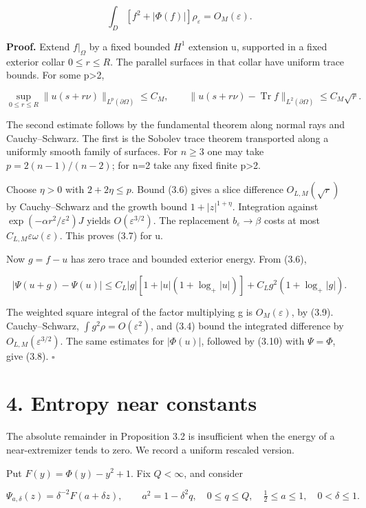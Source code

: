 \documentclass[11pt]{article}
\begin{document}
\[\int_D\left[f^2+|\Phi(f)|\right]\rho_\varepsilon=O_M(\varepsilon).\tag{3.8}\]

\textbf{Proof.} Extend \(f|_\Omega\) by a fixed bounded \(H^{1}\)
extension u, supported in a fixed exterior collar \(0\leq r\leq R\). The
parallel surfaces in that collar have uniform trace bounds. For some
p\textgreater2,

\[\sup_{0\leq r\leq R}\|u(s+r\nu)\|_{L^p(\partial\Omega)}\leq C_M,
\qquad\|u(s+r\nu)-\operatorname{Tr}f\|_{L^2(\partial\Omega)}\leq C_M\sqrt r.\tag{3.9}\]

The second estimate follows by the fundamental theorem along normal rays
and Cauchy--Schwarz. The first is the Sobolev trace theorem transported
along a uniformly smooth family of surfaces. For \(n\geq 3\) one may
take \(p=2(n-1)/(n-2)\); for n=2 take any fixed finite p\textgreater2.

Choose \(\eta >0\) with \(2+2\eta \leq p\). Bound (3.6) gives a slice
difference \(O_{L,M}(\sqrt{r})\) by Cauchy--Schwarz and the growth bound
\(1+|z|^{1+\eta }\). Integration against
\(\exp (-\alpha r^{2}/\varepsilon ^{2})J\) yields
\(O(\varepsilon ^{3/2})\). The replacement \(b_\varepsilon \to \beta\)
costs at most \(C_{L,M}\varepsilon \omega (\varepsilon )\). This proves
(3.7) for u.

Now \(g=f-u\) has zero trace and bounded exterior energy. From (3.6),

\[|\Psi(u+g)-\Psi(u)|
\leq C_L|g|[1+|u|(1+\log_+|u|)]
+C_Lg^2(1+\log_+|g|).\tag{3.10}\]

The weighted square integral of the factor multiplying
\textbar g\textbar{} is \(O_M(\varepsilon )\), by (3.9).
Cauchy--Schwarz, \(\int g^{2}\rho =O(\varepsilon ^{2})\), and (3.4)
bound the integrated difference by \(O_{L,M}(\varepsilon ^{3/2})\). The
same estimates for \(|\Phi (u)|\), followed by (3.10) with
\(\Psi =\Phi\), give (3.8). \(\square\)

\section{4. Entropy near constants}\label{entropy-near-constants}

The absolute remainder in Proposition 3.2 is insufficient when the
energy of a near-extremizer tends to zero. We record a uniform rescaled
version.

Put \(F(y)=\Phi (y)-y^{2}+1\). Fix \(Q<\infty\), and consider

\[\Psi_{a,\delta}(z)=\delta^{-2}F(a+\delta z),\qquad
 a^2=1-\delta^2q,\quad0\leq q\leq Q,\quad\tfrac12\leq a\leq1,\quad0<\delta\leq1.\tag{4.1}\]
\end{document}
